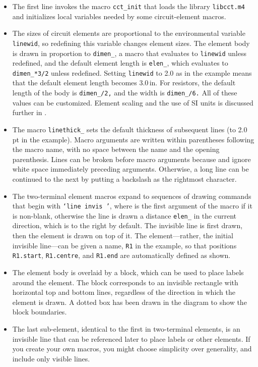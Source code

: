 \begin{itemize}
\item The first line invokes the macro {\tt cct\_init} that
   loads the library {\tt libcct.m4} 
   and initializes local variables needed by some circuit-element macros.

\item
   The sizes of circuit elements are proportional to the \pic environmental
   variable {\tt linewid}, so redefining this variable changes element
   sizes.  The element body is drawn in proportion to {\tt dimen\_},
   a macro that evaluates to {\tt linewid} unless redefined, and the default
   element length is {\tt elen\_}, which evaluates to
   {\tt dimen\_*3/2} unless redefined.
   Setting {\tt linewid} to 2.0 as in the example means that the default element
   length becomes 3.0\,in.
   For resistors, the default length of the body is {\tt dimen\_/2,} and the
   width is {\tt dimen\_/6.} All of these values can be customized.
   Element scaling and the use of SI units is discussed further in
   .

\item The macro {\tt linethick\_} sets the default thickness of subsequent
   lines (to 2.0\,pt in the example).
   Macro arguments are written within parentheses
   following the macro name, with no space between the name and the
   opening parenthesis.  Lines can be broken before macro arguments
   because \Mfour and \dpic ignore white space immediately preceding
   arguments.  Otherwise, a long line can be continued to the next
   by putting a backslash as the rightmost character. 
\item The two-terminal element macros expand to sequences of drawing commands
   that begin with {\tt `line invis \linespec'},
   where \linespec is the first argument of the macro if it
   is non-blank, otherwise the line is drawn a distance
   {\tt elen\_} in the current direction, which is to the right by
   default.
   The invisible line is first drawn, then the element is drawn
   on top of it.
   The element---rather, the initial invisible line---can
   be given a name, {\tt R1} in the example, so that positions
   {\tt R1.start}, {\tt R1.centre}, and {\tt R1.end} are automatically
   defined as shown.
\item The element body is overlaid by a block, which can be
   used to place labels around the element.  The block
   corresponds to an invisible rectangle with horizontal top and bottom lines,
   regardless of the direction in which the element is drawn.  A
   dotted box has been drawn in the diagram to show the block boundaries.
\item The last sub-element, identical to the first in two-terminal
   elements, is an invisible line that can be referenced later to
   place labels or other elements.
   If you create your own macros, you might choose simplicity over generality,
   and include only visible lines.
  \end{itemize}

